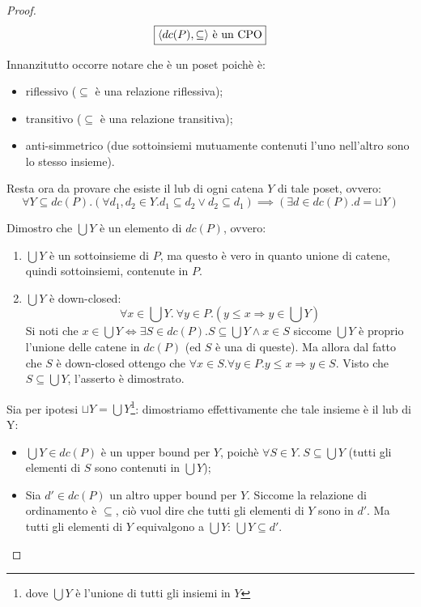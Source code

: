 \begin{proof}

$$
\boxed{\text{\ensuremath{\langle{}dc(P), \subseteq\rangle{}} è un CPO}}
$$

Innanzitutto occorre notare che  è un poset poichè è:

\begin{itemize}
  \item riflessivo ($\subseteq$ è una relazione riflessiva);
  \item transitivo ($\subseteq$ è una relazione transitiva);
  \item anti-simmetrico (due sottoinsiemi mutuamente contenuti l'uno nell'altro
    sono lo stesso insieme).
\end{itemize}

Resta ora da provare che esiste il lub di ogni catena $Y$ di tale poset, ovvero:
$$
\forall{Y}\subseteq dc(P).
          (\forall{d_1,d_2}\in Y.d_1 \subseteq d_2 \lor d_2 \subseteq d_1)
              \implies
          (\exists{d}\in dc(P). d = \sqcup Y)
$$

Dimostro che $\bigcup Y$ è un elemento di $dc(P)$, ovvero:
\begin{enumerate}
	\item $\bigcup Y$ è un sottoinsieme di $P$, ma questo è vero in quanto 
unione di catene, quindi sottoinsiemi, contenute in $P$.
	\item $\bigcup Y$ è down-closed:
	$$
	\forall x \in \bigcup Y.\ \forall y \in P.(y \leq x \Rightarrow y \in \bigcup Y)
	$$
	Si noti che
	$x \in \bigcup Y \iff \exists S \in dc(P).
		S \subseteq \bigcup Y \land x \in S$
	siccome $\bigcup Y$ è proprio l'unione delle catene in $dc(P)$ (ed $S$ è una
	di queste).
	Ma allora dal fatto che $S$ è down-closed ottengo che $\forall x \in S.
        \forall y \in P. y \leq x \Rightarrow y \in S$.
	Visto che $S \subseteq \bigcup Y$, l'asserto è dimostrato.
	\end{enumerate}


Sia per ipotesi $\sqcup Y = \bigcup Y$\footnote{dove $\bigcup Y$ è l'unione di
tutti gli insiemi in $Y$}: dimostriamo effettivamente che tale insieme è il lub
di Y:
\begin{itemize}
  \item $\bigcup Y \in dc(P)$ è un upper bound per $Y$, poichè
    $\forall{S}\in Y.\ S \subseteq \bigcup Y$ (tutti gli elementi di $S$ sono
    contenuti in $\bigcup Y$);
  \item Sia $d'\in dc(P)$ un altro upper bound per $Y$. Siccome la relazione di
    ordinamento è $\subseteq$, ciò vuol dire che tutti gli elementi di $Y$ sono
    in $d'$. Ma tutti gli elementi di $Y$ equivalgono a $\bigcup Y$:
    $\bigcup Y \subseteq d'$.
\end{itemize}


\end{proof}
